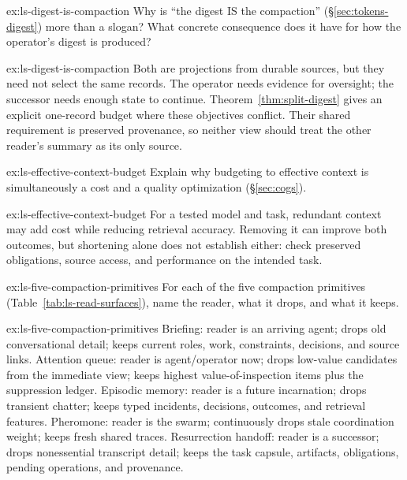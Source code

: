 \documentclass[11pt,a4paper]{article}
\theoremstyle{definition}
\theoremstyle{plain}
\begin{document}
\begin{pdexercise}[kind=Check,rating=1]{ex:ls-digest-is-compaction}
Why is ``the digest IS the compaction'' (\S\ref{sec:tokens-digest}) more than a
slogan? What concrete consequence does it have for how the operator's digest is
produced?
\end{pdexercise}
\begin{pdsolution}{ex:ls-digest-is-compaction}
Both are projections from durable sources, but they need not select the same
records. The operator needs evidence for oversight; the successor needs enough
state to continue. Theorem~\ref{thm:split-digest} gives an explicit one-record
budget where these objectives conflict. Their shared requirement is preserved
provenance, so neither view should treat the other reader's summary as its only source.
\end{pdsolution}
\begin{pdexercise}[kind=Check,rating=1]{ex:ls-effective-context-budget}
Explain why budgeting to effective context is simultaneously a cost
and a quality optimization (\S\ref{sec:cogs}).
\end{pdexercise}
\begin{pdsolution}{ex:ls-effective-context-budget}
For a tested model and task, redundant context may add cost while reducing
retrieval accuracy. Removing it can improve both outcomes, but shortening alone
does not establish either: check preserved obligations, source access, and
performance on the intended task.
\end{pdsolution}
\begin{pdexercise}[kind=Trace,rating=2]{ex:ls-five-compaction-primitives}
For each of the five compaction primitives (Table~\ref{tab:ls-read-surfaces}),
name the reader, what it drops, and what it keeps.
\end{pdexercise}
\begin{pdsolution}{ex:ls-five-compaction-primitives}
Briefing: reader is an arriving agent; drops old conversational detail; keeps current roles, work, constraints, decisions, and source links. Attention queue: reader is agent/operator now; drops low-value candidates from the immediate view; keeps highest value-of-inspection items plus the suppression ledger. Episodic memory: reader is a future incarnation; drops transient chatter; keeps typed incidents, decisions, outcomes, and retrieval features. Pheromone: reader is the swarm; continuously drops stale coordination weight; keeps fresh shared traces. Resurrection handoff: reader is a successor; drops nonessential transcript detail; keeps the task capsule, artifacts, obligations, pending operations, and provenance.
\end{pdsolution}
\end{document}
